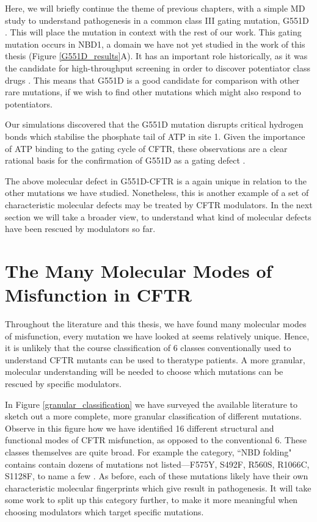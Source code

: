 Here, we will briefly continue the theme of previous chapters, with a simple MD study to understand pathogenesis in a common class III gating mutation, G551D \cite{li1996}. This will place the mutation in context with the rest of our work. This gating mutation occurs in NBD1, a domain we have not yet studied in the work of this thesis (Figure \ref{G551D_results}A). It has an important role historically, as it was the candidate for high-throughput screening in order to discover potentiator class drugs \cite{vangoor2009}. This means that G551D is a good candidate for comparison with other rare mutations, if we wish to find other mutations which might also respond to potentiators.

Our simulations discovered that the G551D mutation disrupts critical hydrogen bonds which stabilise the phosphate tail of ATP in site 1. Given the importance of ATP binding to the gating cycle of CFTR, these observations are a clear rational basis for the confirmation of G551D as a gating defect \cite{}. 

The above molecular defect in G551D-CFTR is a again unique in relation to the other mutations we have studied. Nonetheless, this is another example of a set of characteristic molecular defects may be treated by CFTR modulators. In the next section we will take a broader view, to understand what kind of molecular defects have been rescued by modulators so far.

\section{The Many Molecular Modes of Misfunction in CFTR}

Throughout the literature and this thesis, we have found many molecular modes of misfunction, every mutation we have looked at seems relatively unique. Hence, it is unlikely that the course classification of 6 classes conventionally used to understand CFTR mutants can be used to theratype patients. A more granular, molecular understanding will be needed to choose which mutations can be rescued by specific modulators. 

In Figure \ref{granular_classification} we have surveyed the available literature to sketch out a more complete, more granular classification of different mutations. Observe in this figure how we have identified 16 different structural and functional modes of CFTR misfunction, as opposed to the conventional 6. These classes themselves are quite broad. For example the category, ``NBD folding" contains contain dozens of mutations not listed---F575Y, S492F, R560S, R1066C, S1128F, to name a few \cite{awatade2019, lopes-pacheco2016, casals1997, cotten1996, penmatsa2009}. As before, each of these mutations likely have their own characteristic molecular fingerprints which give result in pathogenesis. It will take some work to split up this category further, to make it more meaningful when choosing modulators which target specific mutations.


